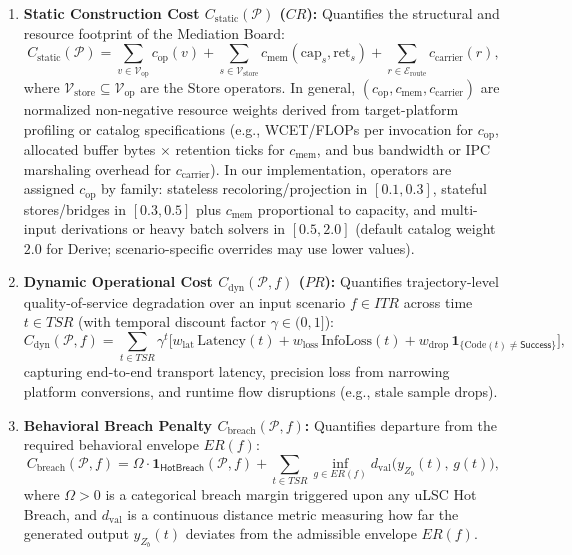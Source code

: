 \begin{enumerate}[topsep=2pt, itemsep=1pt, leftmargin=1.8em]
    \item \textbf{Static Construction Cost $C_{\text{static}}(\mathcal{P})$ ($CR$):} Quantifies the structural and resource footprint of the Mediation Board:
    \begin{equation}
        C_{\text{static}}(\mathcal{P}) = \sum_{v \in \mathcal{V}_{\text{op}}} c_{\text{op}}(v) + \sum_{s \in \mathcal{V}_{\text{store}}} c_{\text{mem}}(\mathrm{cap}_s, \mathrm{ret}_s) + \sum_{r \in \mathcal{E}_{\text{route}}} c_{\text{carrier}}(r),
        \label{eq:c-static}
    \end{equation}
    where $\mathcal{V}_{\text{store}} \subseteq \mathcal{V}_{\text{op}}$ are the Store operators.  In general, $(c_{\text{op}}, c_{\text{mem}}, c_{\text{carrier}})$ are normalized non-negative resource weights derived from target-platform profiling or catalog specifications (e.g., WCET/FLOPs per invocation for $c_{\text{op}}$, allocated buffer bytes $\times$ retention ticks for $c_{\text{mem}}$, and bus bandwidth or IPC marshaling overhead for $c_{\text{carrier}}$).  In our implementation, operators are assigned $c_{\text{op}}$ by family: stateless recoloring/projection in $[0.1, 0.3]$, stateful stores/bridges in $[0.3, 0.5]$ plus $c_{\text{mem}}$ proportional to capacity, and multi-input derivations or heavy batch solvers in $[0.5, 2.0]$ (default catalog weight $2.0$ for Derive; scenario-specific overrides may use lower values).

    \item \textbf{Dynamic Operational Cost $C_{\text{dyn}}(\mathcal{P}, f)$ ($PR$):} Quantifies trajectory-level quality-of-service degradation over an input scenario $f \in ITR$ across time $t \in TSR$ (with temporal discount factor $\gamma \in (0, 1]$):
    \begin{equation}
        C_{\text{dyn}}(\mathcal{P}, f) = \sum_{t \in TSR} \gamma^t \Big[ w_{\text{lat}}\,\mathrm{Latency}(t) + w_{\text{loss}}\,\mathrm{InfoLoss}(t) + w_{\text{drop}}\,\mathbf{1}_{\{\mathrm{Code}(t) \neq \mathsf{Success}\}} \Big],
        \label{eq:c-dyn}
    \end{equation}
    capturing end-to-end transport latency, precision loss from narrowing platform conversions, and runtime flow disruptions (e.g., stale sample drops).

    \item \textbf{Behavioral Breach Penalty $C_{\text{breach}}(\mathcal{P}, f)$:} Quantifies departure from the required behavioral envelope $ER(f)$:
    \begin{equation}
        C_{\text{breach}}(\mathcal{P}, f) = \Omega \cdot \mathbf{1}_{\mathsf{HotBreach}}(\mathcal{P}, f) + \sum_{t \in TSR} \inf_{g \in ER(f)} d_{\text{val}}\big(y_{Z_b}(t),\, g(t)\big),
        \label{eq:c-breach}
    \end{equation}
    where $\Omega > 0$ is a categorical breach margin triggered upon any uLSC Hot Breach, and $d_{\text{val}}$ is a continuous distance metric measuring how far the generated output $y_{Z_b}(t)$ deviates from the admissible envelope $ER(f)$.
\end{enumerate}

